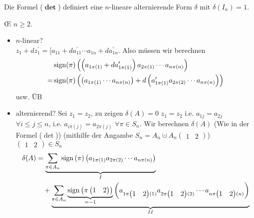 \begin{subtheorem}
	Die Formel ($ \mathbf{\det} $) definiert eine $ n $-lineare alternierende Form $ \delta $ mit $ \delta(I_n) = 1 $.
\end{subtheorem}
\begin{subproof*}
	\OE{} $ n \geq 2 $.
	\begin{itemize}
		\item $ n $-linear?\\
			$ z_1 + dz_1^\prime  = [ a_{11}  + d a_{11}^\prime \dotsb a_{1n} + d a_{1n} ^\prime   $.
			Also müssen wir berechnen
			\begin{align*}
				  & \operatorname{sign}(\pi ) \left( \left( a_{1 \pi (1)} + d a_{1 \pi (1)} ^\prime  \right) a_{2 \pi (1)} \dotsb a_{n \pi (n)}  \right) \\
				= & \operatorname{sign}(\pi ) \left( \left( a_{1 \pi (1)} \dotsb a_{n \pi (n)}  \right) + d\left( a_{1 \pi (1)} ^\prime a_{2 \pi (2)} \dotsb a_{n \pi (n)}  \right)  \right) 
			\end{align*}
			usw. ÜB
		\item alternierend? Sei $ z_1 = z_2 $, zu zeigen $ \delta(A) = 0 $
			$ z_1 = z_2 $ i.e. $ a_{1j} = a_{2j}   $ $ \forall i \leq j \leq n $, i.e. $ a_{i \pi(j) } = a_{2 \pi (j)}   $ $ \forall \pi  \in S_n $.
			Wir berechnen $ \delta(A) $ (Wie in der Formel ($ \det $))
			(mithilfe der Angambe $ S_n = A_n \cupdot A_n \begin{pmatrix} 1 & 2 \end{pmatrix}  $) $ \begin{pmatrix} 1 & 2 \end{pmatrix} \in S_n $ 
			\begin{align*}
				\delta(A) &= \underbrace{\sum_{\pi \in A_n} \Signum \left( \pi  \right) \left( a_{1 \pi (1)} a_{2 \pi (2)} \dotsb a_{n \pi (n)}  \right) }_{I} \\
					  &\quad + \underbrace{\sum_{\pi  \in A_n} \underbrace{ \Signum\left( \pi  \begin{pmatrix} 1 & 2 \end{pmatrix}  \right) }_{=-1} \left( 
						a_{1 \pi \begin{pmatrix} 1 & 2 \end{pmatrix} (1)} a_{2 \pi \begin{pmatrix} 1 & 2 \end{pmatrix} (2)} \dotsb a_{n \pi \begin{pmatrix} 1 & 2 \end{pmatrix} (n)} 
					  \right) }_{II}\\

\end{align*}
\end{itemize}
\end{subproof*}
